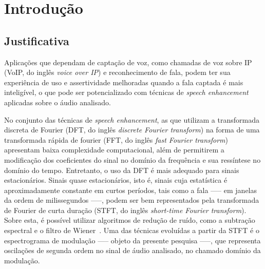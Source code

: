 
\chapter{Introdução}

\section{Justificativa}

Aplicações que dependam de captação de voz, como chamadas de voz sobre IP (VoIP,
 do inglês \textit{voice over IP}) e reconhecimento de fala, podem ter sua
 experiência de uso e assertividade melhoradas quando a fala captada é mais
 inteligível, o que pode ser potencializado com técnicas de \textit{speech
 enhancement} aplicadas sobre o áudio analisado.

No conjunto das técnicas de \textit{speech enhancement}, as que utilizam a
transformada discreta de Fourier (DFT, do inglês \textit{discrete Fourier
transform}) na forma de uma transformada rápida de fourier (FFT, do inglês
\textit{fast Fourier transform}) apresentam baixa complexidade computacional,
além de permitirem a modificação dos coeficientes do sinal no domínio da
frequência e sua ressíntese no domínio do tempo. Entretanto, o uso da DFT é mais
adequado para sinais estacionários. Sinais quase estacionários, isto é, sinais
cuja estatística é aproximadamente constante em curtos períodos, tais como a
fala —-- em janelas da ordem de milissegundos —--, podem ser bem representados
pela transformada de Fourier de curta duração (STFT, do inglês
\textit{short-time Fourier transform}). Sobre esta, é possível utilizar
algoritmos de redução de ruído, como a subtração espectral e o filtro de
Wiener~\cite{parchami2016}. Uma das técnicas evoluídas a partir da STFT é o
espectrograma de modulação —-- objeto da presente pesquisa —--, que representa
oscilações de segunda ordem no sinal de áudio analisado, no chamado domínio da
modulação.

